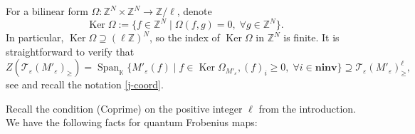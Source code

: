 \documentclass[11pt]{amsart}
\theoremstyle{plain}
\def \KK {{\mathbb C}}
\def \KK {{\mathbb K}}
\def \Zset {{\mathbb Z}}
\newcommand \ninv {{\mathbf{ninv}}}
\def \TT {{\mathcal{T}}}
\def \Om {\Omega}
\def \ep {\varepsilon}
\DeclareMathOperator \Span { {\mathrm{Span}} }
\DeclareMathOperator \Ker { {\mathrm{Ker}} }
\begin{document}
For a bilinear form $\Om : \Zset^N \times \Zset^N \to \Zset/\ell$, denote 
\[
\Ker \Om := \{ f \in \Zset^N \mid \Om(f,g) =0, \; \forall g \in \Zset^N \}.
\]
In particular, $\Ker \Om \supseteq (\ell \Zset)^N$, so the index of $\Ker \Om$ 
in $\Zset^N$ is finite. It is straightforward to verify that
\begin{equation}
\label{ZT}
Z(\TT_\ep(M'_\ep)_\geq) = \Span_\KK 
\{ M'_\ep(f) \mid f \in \Ker \Om_{M'_\ep}, (f)_i \geq 0, \; \forall i \in \ninv \}
\supseteq \TT_\ep(M'_\ep)_{\geq}^\ell,
\end{equation}
see \cite[Eq. (6.1)]{HLY} and recall the notation \eqref{j-coord}. 

Recall the condition (Coprime) on the positive integer $\ell$ from the introduction.
We have the following facts for quantum Frobenius maps:
\end{document}
